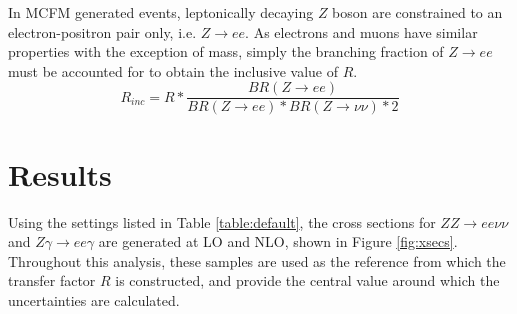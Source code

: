 \documentclass[11pt,a4paper,openright,twoside]{report}
\begin{document}
In MCFM generated events, leptonically decaying $Z$ boson are constrained to an electron-positron pair only, i.e. $Z\to ee$. As electrons and muons have similar properties with the exception of mass, simply the branching fraction of $Z\rightarrow ee$ must be accounted for to obtain the inclusive value of $R$.
\begin{equation}\label{eq:R_inc}
	R_{inc} = R * \frac{BR(Z\rightarrow ee)}{BR(Z \rightarrow ee)*BR(Z\rightarrow \nu\nu)*2}
\end{equation}

\section{Results}
Using the settings listed in Table \ref{table:default}, the cross sections for $ZZ\to ee\nu\nu$ and $Z\gamma\to ee\gamma$ are generated at LO and NLO, shown in Figure \ref{fig:xsecs}. Throughout this analysis, these samples are used as the reference from which the transfer factor $R$ is constructed, and provide the central value around which the uncertainties are calculated.
\end{document}

